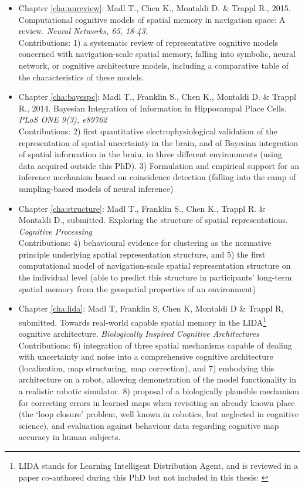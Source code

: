 \begin{itemize}
	\item Chapter \ref{cha:nnreview}: Madl T., Chen K., Montaldi D. \& Trappl R., 2015. Computational cognitive models of spatial memory in navigation space: A review. \textit{Neural Networks, 65, 18-43.}
	\\ Contributions: 1) a systematic review of representative cognitive models concerned with navigation-scale spatial memory, falling into symbolic, neural network, or cognitive architecture models, including a comparative table of the characteristics of these models.
	\item Chapter \ref{cha:bayespc}: Madl T., Franklin S., Chen K., Montaldi D. \& Trappl R., 2014. Bayesian Integration of Information in Hippocampal Place Cells. \textit{PLoS ONE 9(3), e89762}
	\\ Contributions: 2) first quantitative electrophysiological validation of the representation of spatial uncertainty in the brain, and of Bayesian integration of spatial information in the brain, in three different environments (using data acquired outside this PhD). 3) Formulation and empirical support for an inference mechanism based on coincidence detection (falling into the camp of sampling-based models of neural inference)
	\item Chapter \ref{cha:structure}: Madl T., Franklin S., Chen K., Trappl R. \& Montaldi D., submitted. Exploring the structure of spatial representations. \textit{Cognitive Processing}
	\\ Contributions: 4) behavioural evidence for clustering as the normative principle underlying spatial representation structure, and 5) the first computational model of navigation-scale spatial representation structure on the individual level (able to predict this structure in participants' long-term spatial memory from the geospatial properties of an environment)
	\item Chapter \ref{cha:lida}: Madl T, Franklin S, Chen K, Montaldi D \& Trappl R, submitted. Towards real-world capable spatial memory in the LIDA\footnote{LIDA stands for Learning Intelligent Distribution Agent, and is reviewed in a paper co-authored during this PhD but not included in this thesis: \citep{franklin2013lida}} cognitive architecture. \textit{Biologically Inspired Cognitive Architectures}
	\\ Contributions: 6) integration of three spatial mechanisms capable of dealing with uncertainty and noise into a comprehensive cognitive architecture (localization, map structuring, map correction), and 7) embodying this architecture on a robot, allowing demonstration of the model functionality in a realistic robotic simulator. 8) proposal of a biologically plausible mechanism for correcting errors in learned maps when revisiting an already known place (the `loop closure' problem, well known in robotics, but neglected in cognitive science), and evaluation against behaviour data regarding cognitive map accuracy in human subjects.
\end{itemize}


